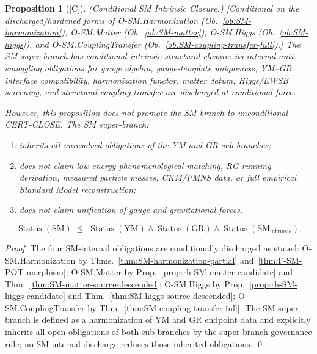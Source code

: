 \documentclass[12pt,oneside]{amsbook}
\theoremstyle{plain}
\newtheorem{proposition}[theorem]{Proposition}
\theoremstyle{definition}
\theoremstyle{remark}
\newcommand{\status}[1]{\textup{[#1]}}
\begin{document}
\begin{proposition}[\status{C}]\label{prop:SM-intrinsic-closure}
\textup{(Conditional SM Intrinsic Closure.)}
\textup{[Conditional on the discharged/hardened forms of
O-SM.Harmonization (Ob.~\ref{ob:SM-harmonization}),
O-SM.Matter (Ob.~\ref{ob:SM-matter}),
O-SM.Higgs (Ob.~\ref{ob:SM-higgs}), and
O-SM.CouplingTransfer (Ob.~\ref{ob:SM-coupling-transfer-full}).]}
The SM super-branch has \emph{conditional intrinsic structural closure}:
its internal anti-smuggling obligations for gauge algebra, gauge-template
uniqueness, YM--GR interface compatibility, harmonization functor,
matter datum, Higgs/EWSB screening, and structural coupling transfer
are discharged at conditional force.

However, this proposition does \emph{not} promote the SM branch to
unconditional CERT-CLOSE. The SM super-branch:
\begin{enumerate}[label=\textup{(\arabic*)}]
 \item inherits all unresolved obligations of the YM and GR sub-branches;
 \item does not claim low-energy phenomenological matching, RG-running
 derivation, measured particle masses, CKM/PMNS data, or full
 empirical Standard Model reconstruction;
 \item does not claim unification of gauge and gravitational forces.
\end{enumerate}
\[
 \operatorname{Status}(\mathrm{SM}) \;\le\;
 \operatorname{Status}(\mathrm{YM}) \wedge
 \operatorname{Status}(\mathrm{GR}) \wedge
 \operatorname{Status}(\mathrm{SM}_{\mathrm{intrinsic}}).
\]
\end{proposition}

\begin{proof}
The four SM-internal obligations are conditionally discharged as stated:
O-SM.Harmonization by Thms.~\ref{thm:SM-harmonization-partial}
and~\ref{thm:F-SM-POT-morphism};
O-SM.Matter by Prop.~\ref{prop:rh-SM-matter-candidate}
and Thm.~\ref{thm:SM-matter-source-descended};
O-SM.Higgs by Prop.~\ref{prop:rh-SM-higgs-candidate}
and Thm.~\ref{thm:SM-higgs-source-descended};
O-SM.CouplingTransfer by Thm.~\ref{thm:SM-coupling-transfer-full}.
The SM super-branch is defined as a harmonization of YM and GR
endpoint data and explicitly inherits all open obligations of both
sub-branches by the super-branch governance rule; no SM-internal
discharge reduces those inherited obligations.
\qed
\end{proof}
\end{document}

